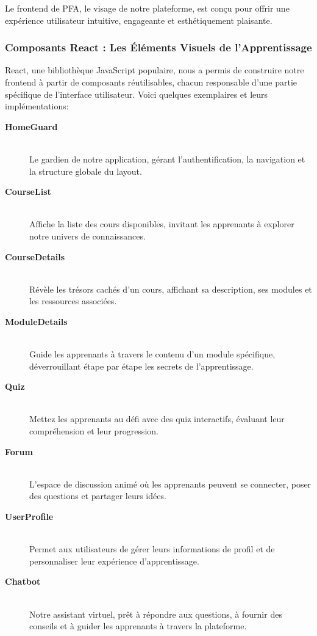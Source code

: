 Le frontend de PFA, le visage de notre plateforme, est conçu pour offrir une expérience utilisateur intuitive, engageante et esthétiquement plaisante.

\subsubsection{Composants React : Les Éléments Visuels de l'Apprentissage}

React, une bibliothèque JavaScript populaire, nous a permis de construire notre frontend à partir de composants réutilisables, chacun responsable d'une partie spécifique de l'interface utilisateur. Voici quelques exemplaires et leurs implémentations:

\begin{description}
    \item[\textbf{HomeGuard}] \hfill \\
    Le gardien de notre application, gérant l'authentification, la navigation et la structure globale du layout.
    
    \item[\textbf{CourseList}] \hfill \\
    Affiche la liste des cours disponibles, invitant les apprenants à explorer notre univers de connaissances.
    
    \item[\textbf{CourseDetails}] \hfill \\
    Révèle les trésors cachés d'un cours, affichant sa description, ses modules et les ressources associées.
    
    \item[\textbf{ModuleDetails}] \hfill \\
    Guide les apprenants à travers le contenu d'un module spécifique, déverrouillant étape par étape les secrets de l'apprentissage.
    
    \item[\textbf{Quiz}] \hfill \\
    Mettez les apprenants au défi avec des quiz interactifs, évaluant leur compréhension et leur progression.
    
    \item[\textbf{Forum}] \hfill \\
    L'espace de discussion animé où les apprenants peuvent se connecter, poser des questions et partager leurs idées.
    
    \item[\textbf{UserProfile}] \hfill \\
    Permet aux utilisateurs de gérer leurs informations de profil et de personnaliser leur expérience d'apprentissage.

    \item[\textbf{Chatbot}] \hfill \\
    Notre assistant virtuel, prêt à répondre aux questions, à fournir des conseils et à guider les apprenants à travers la plateforme.

\end{description}

